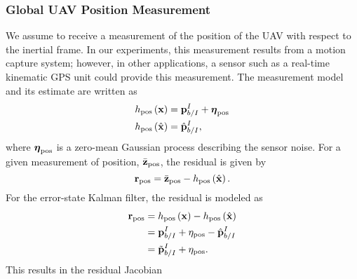 \subsubsection{Global UAV Position Measurement}
We assume to receive a measurement of the position of the UAV with respect to
the inertial frame.
In our experiments, this measurement results from a motion capture system;
however, in other applications,
a sensor such as a real-time kinematic GPS unit could provide this measurement.
The measurement model and its estimate are
written as
\begin{align}
  h_{\text{pos}} \left( \boldsymbol{\mathrm{x}} \right) &= \boldsymbol{\mathrm{p}}_{b/I}^I +
  \boldsymbol{\mathrm{\eta}}_{\text{pos}} \\
  h_{\text{pos}} \left( \hat{\boldsymbol{\mathrm{x}}} \right) &= \hat{\boldsymbol{\mathrm{p}}}_{b/I}^I,
\end{align}
where $\boldsymbol{\mathrm{\eta}}_{\text{pos}}$ is a zero-mean Gaussian process
describing the sensor noise.
For a given measurement of position, $\bar{\boldsymbol{\mathrm{z}}}_{\text{pos}}$, the residual is
given by
\begin{equation}
  \boldsymbol{\mathrm{r}}_{\text{pos}} = \bar{\boldsymbol{\mathrm{z}}}_{\text{pos}} - h_{\text{pos}} \left( \hat{\boldsymbol{\mathrm{x}}}
  \right).
\end{equation}
For the error-state Kalman filter, the residual is modeled as
\begin{align}
  \boldsymbol{\mathrm{r}}_{\text{pos}} &=  h_{\text{pos}} \left( \boldsymbol{\mathrm{x}} \right) - h_{\text{pos}} \left( \hat{\boldsymbol{\mathrm{x}}}
  \right) \\
                        &= \boldsymbol{\mathrm{p}}_{b/I}^I + \eta_{\text{pos}} -
                        \hat{\boldsymbol{\mathrm{p}}}_{b/I}^I \\
                        &= \tilde{\boldsymbol{\mathrm{p}}}_{b/I}^I + \eta_{\text{pos}}.
\end{align}
This results in the residual Jacobian
